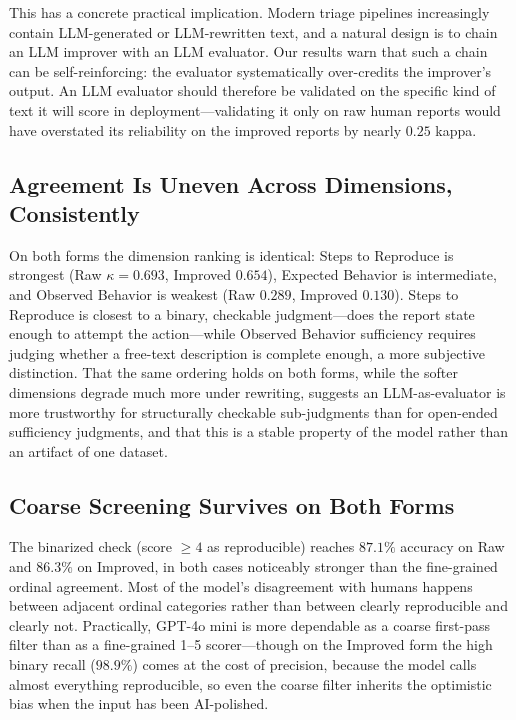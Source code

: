 This has a concrete practical implication. Modern triage pipelines increasingly
contain LLM-generated or LLM-rewritten text, and a natural design is to chain an
LLM improver with an LLM evaluator. Our results warn that such a chain can be
self-reinforcing: the evaluator systematically over-credits the improver's
output. An LLM evaluator should therefore be validated on the specific kind of
text it will score in deployment---validating it only on raw human reports would
have overstated its reliability on the improved reports by nearly $0.25$ kappa.

\subsection{Agreement Is Uneven Across Dimensions, Consistently}
\label{subsec:disc-dimensions}

On both forms the dimension ranking is identical: Steps to Reproduce is
strongest (Raw $\kappa = 0.693$, Improved $0.654$), Expected Behavior is
intermediate, and Observed Behavior is weakest (Raw $0.289$, Improved $0.130$).
Steps to Reproduce is closest to a binary, checkable judgment---does the report
state enough to attempt the action---while Observed Behavior sufficiency
requires judging whether a free-text description is complete enough, a more
subjective distinction. That the same ordering holds on both forms, while the
softer dimensions degrade much more under rewriting, suggests an LLM-as-evaluator
is more trustworthy for structurally checkable sub-judgments than for open-ended
sufficiency judgments, and that this is a stable property of the model rather
than an artifact of one dataset.

\subsection{Coarse Screening Survives on Both Forms}
\label{subsec:disc-binarized}

The binarized check (score $\geq 4$ as reproducible) reaches $87.1\%$ accuracy
on Raw and $86.3\%$ on Improved, in both cases noticeably stronger than the
fine-grained ordinal agreement. Most of the model's disagreement with humans
happens between adjacent ordinal categories rather than between clearly
reproducible and clearly not. Practically, GPT-4o mini is more dependable as a
coarse first-pass filter than as a fine-grained 1--5 scorer---though on the
Improved form the high binary recall ($98.9\%$) comes at the cost of precision,
because the model calls almost everything reproducible, so even the coarse
filter inherits the optimistic bias when the input has been AI-polished.


